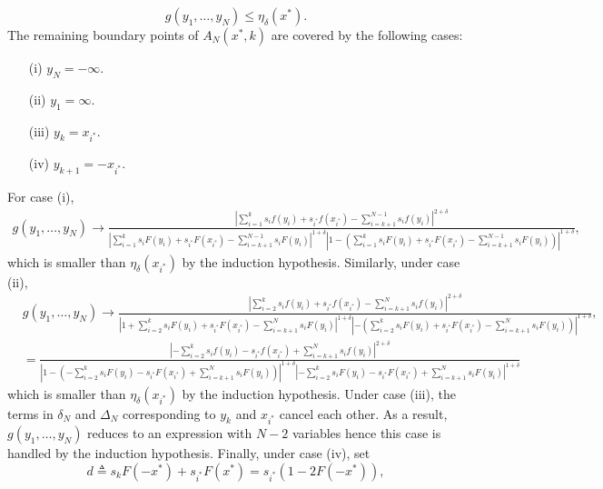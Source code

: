 \begin{proof-of-lemma}[\ref{lem:bound_intervals_delta}]
\begin{equation*}
    g(y_1,\ldots,y_N) \leq \eta_{\delta}(x^*).
  \end{equation*}
  The remaining boundary points of $A_N(x^*,k)$ are covered by the following cases:
  \begin{itemize}
  \item[(i)]  $y_N = -\infty$. 
  \item[(ii)] $y_1 = \infty$.
  \item[(iii)] $y_k = x_{i^*}$.
  \item[(iv)] $y_{k+1} = -x_{i^*}$. 
  \end{itemize}
  For case (i), 
  \begin{align*}
    g(y_1,\ldots,y_N) \to \frac{ \left| \sum_{i=1}^{k} s_i f(y_i) + s_{i^*} f(x_{i^*}) - \sum_{i=k+1}^{N-1} s_i f(y_i) \right|^{2+\delta}} 
    {\left| \sum_{i=1}^{k} s_i F(y_i) + s_{i^*} F(x_{i^*}) - \sum_{i=k+1}^{N-1} s_i F(y_i) \right|^{1+\delta}\left|1- \left( \sum_{i=1}^{k} s_i F(y_i) + s_{i^*} F(x_{i^*}) - \sum_{i=k+1}^{N-1} s_i F(y_i) \right)  \right|^{1+\delta} },
  \end{align*}
  which is smaller than $\eta_\delta(x_{i^*})$ by the induction hypothesis. Similarly, under case (ii),
  \begin{align*}
    & g(y_1,\ldots,y_N) \to 
    \frac{ \left| \sum_{i=2}^{k} s_i f(y_i) + s_{i^*} f(x_{i^*}) - \sum_{i=k+1}^{N} s_i f(y_i) \right|^{2+\delta}} 
         {\left| 1+ \sum_{i=2}^{k} s_i F(y_i) + s_{i^*} F(x_{i^*}) - \sum_{i=k+1}^{N} s_i F(y_i) \right|^{1+\delta}\left|-\left( \sum_{i=2}^{k} s_i F(y_i) + s_{i^*} F(x_{i^*}) - \sum_{i=k+1}^{N} s_i F(y_i) \right)  \right|^{1+\delta} },
         \\
         & = \frac{ \left| -\sum_{i=2}^{k} s_i f(y_i) - s_{i^*} f(x_{i^*}) + \sum_{i=k+1}^{N} s_i f(y_i) \right|^{2+\delta}} 
           { \left|1 - \left(-\sum_{i=2}^{k} s_i F(y_i) - s_{i^*} F(x_{i^*}) + \sum_{i=k+1}^{N} s_i F(y_i) \right) \right|^{1+\delta} 
             \left|-\sum_{i=2}^{k} s_i F(y_i) - s_{i^*} F(x_{i^*}) + \sum_{i=k+1}^{N} s_i F(y_i) \right|^{1+\delta} }
  \end{align*}
  which is smaller than $\eta_{\delta}(x_{i^*})$ by the induction hypothesis. Under case (iii), the terms in $\delta_N$ and $\Delta_N$ corresponding to $y_k$ and $x_{i^*}$ cancel each other. As a result,  $g(y_1,\ldots,y_N)$ reduces to an expression with $N-2$ variables hence this case is handled by the induction hypothesis. 
  Finally, under case (iv), set 
  \begin{equation*}
    d \triangleq s_k F(-x^*) + s_{i^*} F(x^*) = s_{i^*}\left(1-2F(-x^*) \right), 

\end{equation*}
\end{proof-of-lemma}
